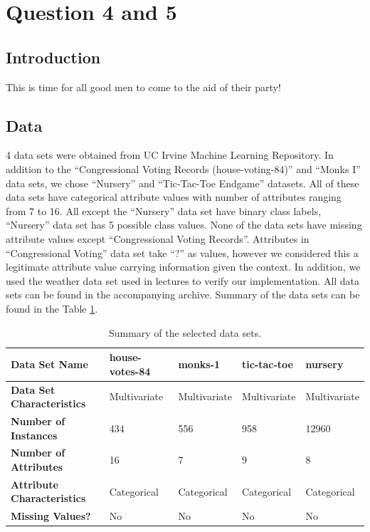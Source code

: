\documentclass[12pt]{article}
\begin{document}
\section{Question 4 and 5}

\subsection{Introduction}
This is time for all good men to come to the aid of their party!

\subsection{Data}
4 data sets were obtained from UC Irvine Machine Learning
Repository. In addition to the ``Congressional Voting Records
(house-voting-84)'' and ``Monks I'' data sets, we chose ``Nursery''
and ``Tic-Tac-Toe Endgame'' datasets. All of these data sets have
categorical attribute values with number of attributes ranging from 7
to 16. All except the ``Nursery'' data set have binary class labels,
``Nursery'' data set has 5 possible class values. None of the data
sets have missing attribute values except ``Congressional Voting
Records''. Attributes in ``Congressional Voting'' data set take ``?''
as values, however we considered this a legitimate attribute value
carrying information given the context. In addition, we used the
weather data set used in lectures to verify our implementation.  All
data sets can be found in the accompanying archive. Summary of the
data sets can be found in the Table \ref{table:datasetsummary}.

\begin{table}[H]
  \centering
  \begin{small}
    \begin{tabular}{|l|l|l|l|l|}
      \hline
      \textbf{Data Set Name}             & house-votes-84 & monks-1      & tic-tac-toe  & nursery      \\ \hline
      \textbf{Data Set Characteristics}  & Multivariate   & Multivariate & Multivariate & Multivariate \\ \hline
      \textbf{Number of Instances}       & 434            & 556          & 958          & 12960        \\ \hline
      \textbf{Number of Attributes}      & 16             & 7            & 9            & 8            \\ \hline
      \textbf{Attribute Characteristics} & Categorical    & Categorical  & Categorical  & Categorical  \\ \hline
      \textbf{Missing Values?}           & No             & No           & No           & No           \\ \hline
    \end{tabular}
  \end{small}
  \caption{Summary of the selected data sets.}
  \label{table:datasetsummary}
\end{table}
\end{document}
